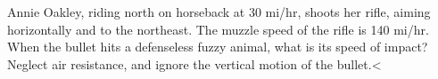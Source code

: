 Annie Oakley, riding north on horseback at 30 mi/hr,
        shoots her rifle, aiming horizontally and to the northeast. 
        The muzzle speed of the rifle is 140 mi/hr.  When the bullet
        hits a defenseless fuzzy animal, what is its speed of
        impact?  Neglect air resistance, and ignore the vertical
        motion of the bullet.<%
